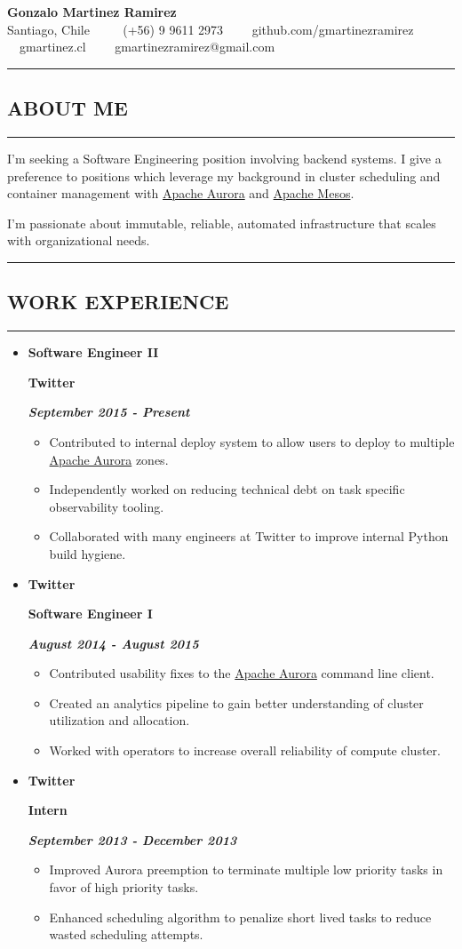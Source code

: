 \documentclass[10pt,letterpaper]{article}
\newcommand\textbox[1]{%
  \parbox{.333\textwidth}{#1}%
}
\newcommand{\titlePersonalInfo}[6]{
  \begin{center}{\huge \textbf{#1}}
  \\  #2 \ \ \textbullet
    \ \ #3\ \ \textbullet
    \ \ #4\ \ \textbullet
    \ \ #5\ \ \textbullet
    \ \ #6    
  \end{center}
}
\newcommand{\sectionTitle}[1]{
  \hrule
  \vspace{-1.0em} 
  \subsection*{\uppercase{\textbf{#1}}}
  \vspace{-0.3em}
    \hrule
    \vspace{0.5em}  
}
\newcommand{\titleExperienceWithoutLocation}[3]{
  \item[]
  {
    \textbox{\textbf{#1}\hfill}\textbox{\hfil \textbf{#2}\hfil}\hfill \textbf{\emph{#3}}
  }
}
\begin{document}
    
  \titlePersonalInfo{Gonzalo Martinez Ramirez}{Santiago, Chile}{(+56) 9 9611 2973}{github.com/gmartinezramirez}{gmartinez.cl}{gmartinezramirez@gmail.com}
  
  \sectionTitle{About me}
  
  \noindent I'm seeking a Software Engineering position involving backend systems.
  I give a preference to positions which leverage my background in cluster
  scheduling and container management with \href{aurora.apache.org}{Apache Aurora}
  and \href{mesos.apache.org}{Apache Mesos}.
  
  \noindent I'm passionate about immutable, reliable, automated infrastructure
  that scales with organizational needs.
  \\
  
  \sectionTitle{Work Experience}
  \begin{itemize}[leftmargin=*]
    \parskip=-0.6em
    
    \titleExperienceWithoutLocation{Software Engineer II}{Twitter}{September 2015 - Present}
    \begin{itemize}[label=\textbullet]
      \itemsep0em
      \item Contributed to internal deploy system to allow users to deploy to
      multiple \href{aurora.apache.org}{Apache Aurora} zones.
      \item Independently worked on reducing technical debt on task specific
      observability tooling.
      \item Collaborated with many engineers at Twitter to improve internal
      Python build hygiene.
    \end{itemize}
    
    \titleExperienceWithoutLocation{Twitter}{Software Engineer I}{August 2014 - August 2015}
    \begin{itemize}[label=\textbullet]
      \itemsep0em
      \item Contributed usability fixes to the
      \href{aurora.apache.org}{Apache Aurora} command line client.
      \item Created an analytics pipeline to gain better understanding of
      cluster utilization and allocation.
      \item Worked with operators to increase overall reliability of compute
      cluster.
    \end{itemize}
    
    \titleExperienceWithoutLocation{Twitter}{Intern}{September 2013 - December 2013}
    \begin{itemize}[label=\textbullet]
      \itemsep0em
      \item Improved Aurora preemption to terminate multiple low priority tasks
      in favor of high priority tasks.
      \item Enhanced scheduling algorithm to penalize short lived tasks to
      reduce wasted scheduling attempts.
    \end{itemize}
    

\end{itemize}
\end{document}
